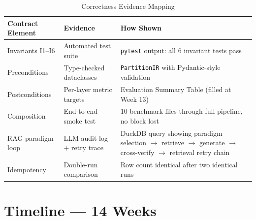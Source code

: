 \documentclass[11pt,a4paper]{article}
\begin{document}
\begin{table}[H]
\centering
\caption{Correctness Evidence Mapping}
\renewcommand{\arraystretch}{1.3}
\small
\begin{tabularx}{\textwidth}{@{} L{3.5cm} L{4cm} X @{}}
\toprule
\textbf{Contract Element} & \textbf{Evidence} & \textbf{How Shown} \\
\midrule
Invariants I1--I6 & Automated test suite & \texttt{pytest} output: all 6 invariant tests pass \\
Preconditions & Type-checked dataclasses & \texttt{PartitionIR} with Pydantic-style validation \\
Postconditions & Per-layer metric targets & Evaluation Summary Table (filled at Week 13) \\
Composition & End-to-end smoke test & 10 benchmark files through full pipeline, no block lost \\
RAG paradigm loop & LLM audit log + retry trace & DuckDB query showing paradigm selection $\to$ retrieve $\to$ generate $\to$ cross-verify $\to$ retrieval retry chain \\
Idempotency & Double-run comparison & Row count identical after two identical runs \\
\bottomrule
\end{tabularx}
\end{table}


\section{Timeline — 14 Weeks}
\end{document}
